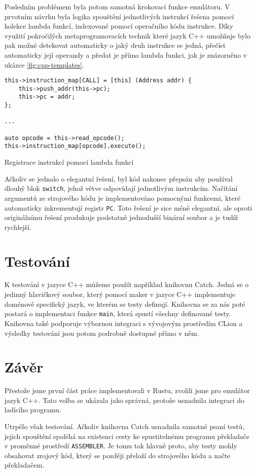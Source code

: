 Posledním problémem byla potom samotná krokovací funkce emulátoru. V prvotním návrhu byla logika spouštění jednotlivých instrukcí řešena pomocí kolekce lambda funkcí, indexované pomocí operačního kódu instrukce. Díky využití pokročilých metaprogramovacích technik které jazyk C++ umožňuje bylo pak možné detekovat automaticky o jaký druh instrukce se jedná, přečíst automaticky její operandy a předat je přímo lambda funkci, jak je znázorněno v ukázce \ref{fig:cpp-templates}.

\begin{listing}
\begin{verbatim}
this->instruction_map[CALL] = [this] (Address addr) {
	this->push_addr(this->pc);
	this->pc = addr;
};

...

auto opcode = this->read_opcode();
this->instruction_map[opcode].execute();
\end{verbatim}
\caption{Registrace instrukcí pomocí lambda funkcí}
\label{fig:cpp-templates}
\end{listing}

Ačkoliv se jednalo o elegantní řešení, byl kód nakonec přepsán aby používal dlouhý blok \texttt{switch}, jehož větve odpovídají jednotlivým instrukcím. Načítání argumentů ze strojového kódu je implementováno pomocnými funkcemi, které automaticky inkrementují registr \texttt{PC}. Toto řešení je sice méně elegantní, ale oproti originálnímu řešení produkuje podstatně jednodušší binární soubor a je tudíž rychlejší.

\section{Testování}
\label{sec:emu-test}

K testování v jazyce C++ můžeme použít například knihovnu Catch\cite{github-catch}. Jedná se o jedinný hlavičkový soubor, který pomocí maker v jazyce C++ implementuje doménově specifický jazyk, ve kterém se testy definují. Knihovna se za nás poté postará o implementaci funkce \texttt{main}, která spustí všechny definované testy. Knihovna také podporuje výbornou integraci s vývojovým prostředím CLion\cite{clion-catch} a výsledky testování jsou potom podrobně dostupné přímo v něm.


\section{Závěr}

Přestože jsme první část práce implementovali v Rustu, zvolili jsme pro emulátor jazyk C++. Tato volba se ukázala jako správná, protože usnadnila integraci do ladícího programu.

Utrpělo však testování. Ačkoliv knihovna Catch usnadnila samotné psaní testů, jejich spouštění spoléhá na existenci cesty ke spustitelnému programu překladače v proměnné prostředí \texttt{ASSEMBLER}. Je tomu tak hlavně proto, aby testy mohly obsahovat zrojový kód, který se později přeloží do strojového kódu a načte překladačem.